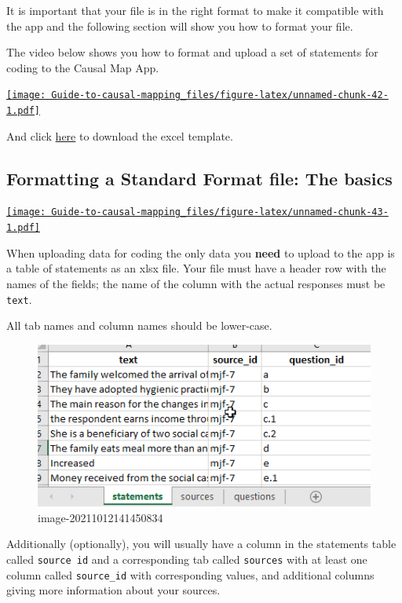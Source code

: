 \documentclass[
]{book}
\begin{document}
It is important that your file is in the right format to make it compatible with the app and the following section will show you how to format your file.

The video below shows you how to format and upload a set of statements for coding to the Causal Map App.

\href{https://player.vimeo.com/video/637121851}{\texttt{[image: Guide-to-causal-mapping\_files/figure-latex/unnamed-chunk-42-1.pdf]}}

And click \href{https://drive.google.com/uc?export=download\&id=126fAfkJSbUXkqHp_OkE3af2vdxhMjRy-}{here} to download the excel template.

\hypertarget{formattingyourfile}{%
\subsection{Formatting a Standard Format file: The basics}\label{formattingyourfile}}

\href{https://player.vimeo.com/video/604138709}{\texttt{[image: Guide-to-causal-mapping\_files/figure-latex/unnamed-chunk-43-1.pdf]}}

When uploading data for coding the only data you \textbf{need} to upload to the app is a table of statements as an xlsx file. Your file must have a header row with the names of the fields; the name of the column with the actual responses must be \texttt{text}.

All tab names and column names should be lower-case.

\begin{figure}
\centering
\includegraphics[width=6.77083in,height=\textheight]{_assets/image-20211012141450834.png}
\caption{image-20211012141450834}
\end{figure}

Additionally (optionally), you will usually have a column in the statements table called \texttt{source\ id} and a corresponding tab called \texttt{sources} with at least one column called \texttt{source\_id} with corresponding values, and additional columns giving more information about your sources.
\end{document}
